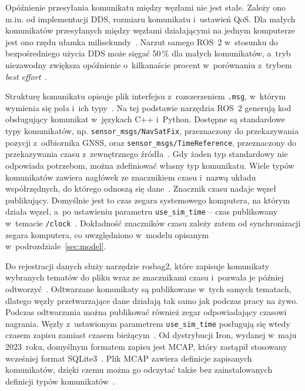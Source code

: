 Opóźnienie przesyłania komunikatu między węzłami nie jest stałe. Zależy ono m.in. od implementacji DDS, rozmiaru komunikatu i~ustawień QoS. Dla małych komunikatów przesyłanych między węzłami działającymi na jednym komputerze jest ono rzędu ułamka milisekundy~\cite{ye2023realtime,kronauer2021latency}. Narzut samego ROS~2 w~stosunku do bezpośredniego użycia DDS może sięgać 50\,\% dla małych komunikatów, a~tryb niezawodny zwiększa opóźnienie o~kilkanaście procent w~porównaniu z~trybem \textit{best effort}~\cite{kronauer2021latency}.

Strukturę komunikatu opisuje plik interfejsu z~rozszerzeniem \texttt{.msg}, w~którym wymienia się pola i~ich typy~\cite{ros2jazzy}. Na tej podstawie narzędzia ROS~2 generują kod obsługujący komunikat w~językach C++ i~Python. Dostępne są standardowe typy komunikatów, np. \texttt{sensor\_msgs/NavSatFix}, przeznaczony do przekazywania pozycji z~odbiornika GNSS, oraz \texttt{sensor\_msgs/TimeReference}, przeznaczony do przekazywania czasu z~zewnętrznego źródła~\cite{ros2jazzy}. Gdy żaden typ standardowy nie odpowiada potrzebom, można zdefiniować własny typ komunikatu. Wiele typów komunikatów zawiera nagłówek ze znacznikiem czasu i~nazwą układu współrzędnych, do którego odnoszą się dane~\cite{ros2jazzy}. Znacznik czasu nadaje węzeł publikujący. Domyślnie jest to czas zegara systemowego komputera, na którym działa węzeł, a~po ustawieniu parametru \texttt{use\_sim\_time} -- czas publikowany w~temacie \texttt{/clock}~\cite{ros2jazzy}. Dokładność znaczników czasu zależy zatem od synchronizacji zegara komputera, co uwzględniono w~modelu opisanym w~podrozdziale~\ref{sec:model}.

Do rejestracji danych służy narzędzie rosbag2, które zapisuje komunikaty wybranych tematów do pliku wraz ze znacznikami czasu i~pozwala je później odtworzyć~\cite{ros2jazzy}. Odtwarzane komunikaty są publikowane w~tych samych tematach, dlatego węzły przetwarzające dane działają tak samo jak podczas pracy na żywo. Podczas odtwarzania można publikować również zegar odpowiadający czasowi nagrania. Węzły z~ustawionym parametrem \texttt{use\_sim\_time} posługują się wtedy czasem zapisu zamiast czasem bieżącym~\cite{ros2jazzy}. Od dystrybucji Iron, wydanej w~maju 2023~roku, domyślnym formatem zapisu jest MCAP, który zastąpił stosowany wcześniej format SQLite3~\cite{ros2iron}. Plik MCAP zawiera definicje zapisanych komunikatów, dzięki czemu można go odczytać także bez zainstalowanych definicji typów komunikatów~\cite{ros2iron,mcap}.


